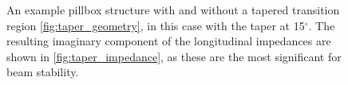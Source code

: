 \begin{figure}

\label{fig:taper_ex}
\caption{An example pillbox structure with and without a tapered transition region \ref{fig:taper_geometry}, in this case with the taper at 15$^{\circ}$. The resulting imaginary component of the longitudinal impedances are shown in \ref{fig:taper_impedance}, as these are the most significant for beam stability.}
\end{figure}

